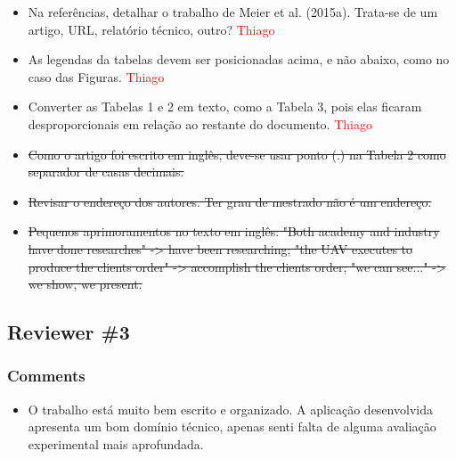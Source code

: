 \documentclass[12pt]{article}
\begin{document}
\begin{itemize}

\item Na referências, detalhar o trabalho de Meier et al. (2015a). Trata-se de um artigo, URL, relatório técnico, outro? \textcolor{red}{Thiago}

\item As legendas da tabelas devem ser posicionadas acima, e não abaixo, como no caso das Figuras. \textcolor{red}{Thiago}

\item Converter as Tabelas 1 e 2 em texto, como a Tabela 3, pois elas ficaram desproporcionais em relação ao restante do documento. \textcolor{red}{Thiago}

\item \sout{Como o artigo foi escrito em inglês, deve-se usar ponto (.) na Tabela 2 como separador de casas decimais.}

\item \sout{Revisar o endereço dos autores. Ter grau de mestrado não é um endereço.}

\item \sout{Pequenos aprimoramentos no texto em inglês: "Both academy and industry have done researches" -> have been researching; "the UAV executes to produce the clients order" -> accomplish the clients order; "we can see..." -> we show, we present.}

\end{itemize}

\subsection{Reviewer \#3}

\subsubsection{Comments}

\begin{itemize}
\item O trabalho está muito bem escrito e organizado. A aplicação desenvolvida apresenta um bom domínio técnico, apenas senti falta de alguma avaliação experimental mais aprofundada.

\end{itemize}
\end{document}
